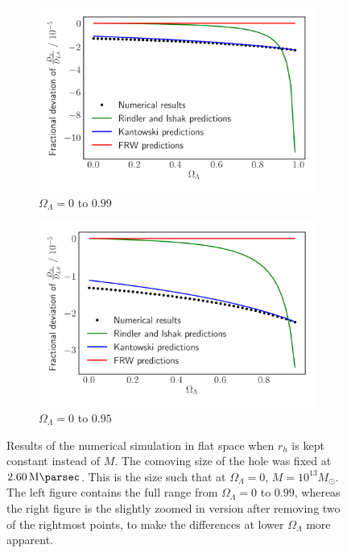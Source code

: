 \begin{figure}
  \centering
  \begin{subfigure}{0.8\textwidth}
    \includegraphics[width=\textwidth]{images/flat_const_rh.png}
    \caption{$\Omega_{\Lambda} = 0$ to $0.99$}
  \end{subfigure}%

  \begin{subfigure}{0.8\textwidth}
    \includegraphics[width=\textwidth]{images/flat_const_rh2.png}
    \caption{$\Omega_{\Lambda} = 0$ to $0.95$}
  \end{subfigure}%
  \caption{Results of the numerical simulation in flat space when $r_h$ is kept constant instead of $M$. The comoving size of the hole was fixed at $\SI{2.60}{\mega\parsec}$. This is the size such that at $\Omega_{\Lambda} = 0$, $M = 10^{13}M_{\odot}$. The left figure contains the full range from $\Omega_{\Lambda} = 0$ to $0.99$, whereas the right figure is the slightly zoomed in version after removing two of the rightmost points, to make the differences at lower $\Omega_{\Lambda}$ more apparent.}
  \label{fig:flat-const-rh}
\end{figure}


